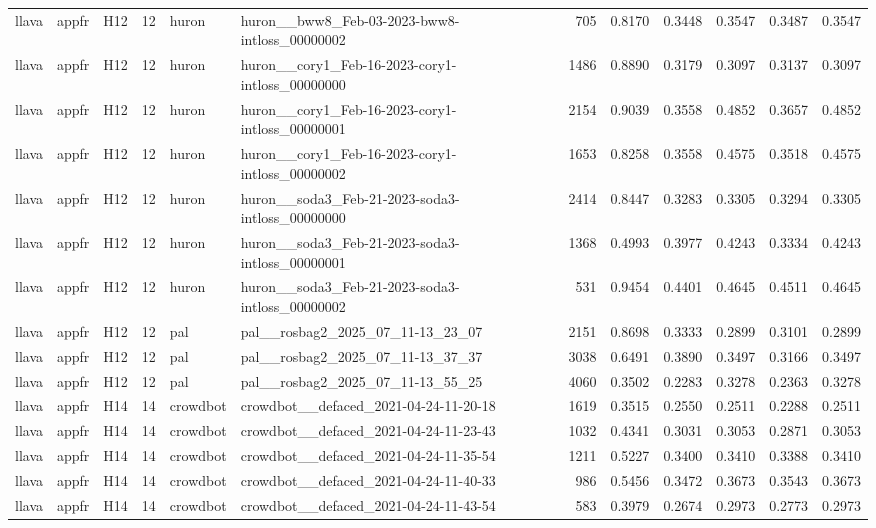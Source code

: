 \begin{table}[tbp]
\begin{tabular}{lllrllrrrrrr}
llava & appfr & H12 & 12 & huron & huron\_\_bww8\_Feb-03-2023-bww8-intloss\_00000002 & 705 & 0.8170 & 0.3448 & 0.3547 & 0.3487 & 0.3547 \\
llava & appfr & H12 & 12 & huron & huron\_\_cory1\_Feb-16-2023-cory1-intloss\_00000000 & 1486 & 0.8890 & 0.3179 & 0.3097 & 0.3137 & 0.3097 \\
llava & appfr & H12 & 12 & huron & huron\_\_cory1\_Feb-16-2023-cory1-intloss\_00000001 & 2154 & 0.9039 & 0.3558 & 0.4852 & 0.3657 & 0.4852 \\
llava & appfr & H12 & 12 & huron & huron\_\_cory1\_Feb-16-2023-cory1-intloss\_00000002 & 1653 & 0.8258 & 0.3558 & 0.4575 & 0.3518 & 0.4575 \\
llava & appfr & H12 & 12 & huron & huron\_\_soda3\_Feb-21-2023-soda3-intloss\_00000000 & 2414 & 0.8447 & 0.3283 & 0.3305 & 0.3294 & 0.3305 \\
llava & appfr & H12 & 12 & huron & huron\_\_soda3\_Feb-21-2023-soda3-intloss\_00000001 & 1368 & 0.4993 & 0.3977 & 0.4243 & 0.3334 & 0.4243 \\
llava & appfr & H12 & 12 & huron & huron\_\_soda3\_Feb-21-2023-soda3-intloss\_00000002 & 531 & 0.9454 & 0.4401 & 0.4645 & 0.4511 & 0.4645 \\
llava & appfr & H12 & 12 & pal & pal\_\_rosbag2\_2025\_07\_11-13\_23\_07 & 2151 & 0.8698 & 0.3333 & 0.2899 & 0.3101 & 0.2899 \\
llava & appfr & H12 & 12 & pal & pal\_\_rosbag2\_2025\_07\_11-13\_37\_37 & 3038 & 0.6491 & 0.3890 & 0.3497 & 0.3166 & 0.3497 \\
llava & appfr & H12 & 12 & pal & pal\_\_rosbag2\_2025\_07\_11-13\_55\_25 & 4060 & 0.3502 & 0.2283 & 0.3278 & 0.2363 & 0.3278 \\
llava & appfr & H14 & 14 & crowdbot & crowdbot\_\_defaced\_2021-04-24-11-20-18 & 1619 & 0.3515 & 0.2550 & 0.2511 & 0.2288 & 0.2511 \\
llava & appfr & H14 & 14 & crowdbot & crowdbot\_\_defaced\_2021-04-24-11-23-43 & 1032 & 0.4341 & 0.3031 & 0.3053 & 0.2871 & 0.3053 \\
llava & appfr & H14 & 14 & crowdbot & crowdbot\_\_defaced\_2021-04-24-11-35-54 & 1211 & 0.5227 & 0.3400 & 0.3410 & 0.3388 & 0.3410 \\
llava & appfr & H14 & 14 & crowdbot & crowdbot\_\_defaced\_2021-04-24-11-40-33 & 986 & 0.5456 & 0.3472 & 0.3673 & 0.3543 & 0.3673 \\
llava & appfr & H14 & 14 & crowdbot & crowdbot\_\_defaced\_2021-04-24-11-43-54 & 583 & 0.3979 & 0.2674 & 0.2973 & 0.2773 & 0.2973 \\

\end{tabular}
\end{table}
